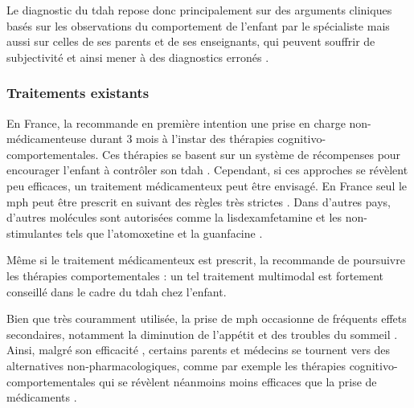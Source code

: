 Le diagnostic du \gls{tdah} repose donc principalement sur des arguments cliniques basés sur les observations du comportement de l'enfant par le spécialiste 
mais aussi sur celles de ses parents et de ses enseignants, qui peuvent souffrir de
subjectivité et ainsi mener à des diagnostics erronés \citep{Lambez2019}.

\subsubsection{Traitements existants} \label{traitements_existants}

En France, la \citet{HAS} recommande en première intention une prise en charge non-médicamenteuse durant 3 mois à l'instar des thérapies cognitivo-comportementales. 
Ces thérapies se basent sur un système de récompenses pour encourager l'enfant à contrôler son \gls{tdah} \citep{Evans2011, Sonuga2004}.
Cependant, si ces approches se révèlent peu efficaces, un traitement médicamenteux peut être envisagé. En France seul le \gls{mph}
peut être prescrit en suivant des règles très strictes \citep{HAS}. Dans d'autres pays, d'autres molécules sont autorisées comme la lisdexamfetamine et 
les non-stimulantes tels que l'atomoxetine et la guanfacine \citep{Luan2017, Cortese2018}.

Même si le traitement médicamenteux est prescrit, la \citet{HAS} recommande de poursuivre les thérapies comportementales : un tel traitement multimodal 
est fortement conseillé dans le cadre du \gls{tdah} chez l'enfant.

Bien que très couramment utilisée,  la prise de \gls{mph} occasionne de fréquents effets secondaires,
notamment la diminution de l'appétit et des troubles du sommeil \citep{Sousa2012}. Ainsi, malgré son efficacité \citep{Taylor2014,
Storebo2015, Swanson2017, Cortese2018}, certains parents et médecins se tournent vers des alternatives non-pharmacologiques, comme par exemple les thérapies cognitivo-comportementales \citep{Berger2008} qui se révèlent néanmoins
moins efficaces que la prise de médicaments \citep{Sonuga-Barke2013}. 

